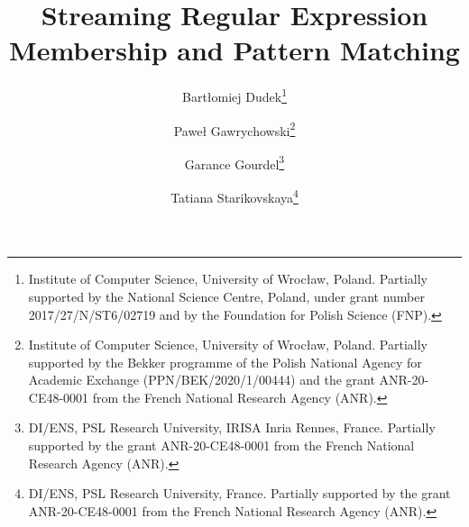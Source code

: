 \documentclass[twoside,leqno]{article}
\title{\Large Streaming Regular Expression Membership and Pattern Matching}
\begin{document}
\author{Bart\l{}omiej Dudek\thanks{Institute of Computer Science, University of Wroc\l{}aw, Poland. Partially supported by the National Science Centre, Poland, under grant number 2017/27/N/ST6/02719 and by the Foundation for
Polish Science (FNP).}
\and Pawe{\l} Gawrychowski\thanks{Institute of Computer Science, University of Wroc\l{}aw, Poland. Partially supported by the Bekker programme of the Polish National Agency for Academic Exchange (PPN/BEK/2020/1/00444) and the grant ANR-20-CE48-0001 from the French National Research Agency (ANR).} 
\and Garance Gourdel\thanks{DI/ENS, PSL Research University, IRISA Inria Rennes, France. Partially supported by the grant ANR-20-CE48-0001 from the French National Research Agency (ANR).} 
\and Tatiana Starikovskaya\thanks{DI/ENS, PSL Research University, France. Partially supported by the grant ANR-20-CE48-0001 from the French National Research Agency (ANR).}}



\date{}

\maketitle
\end{document}
